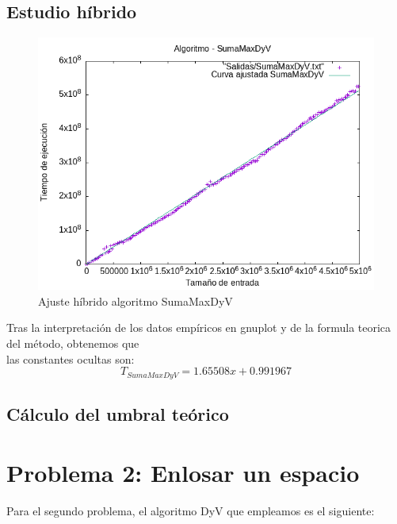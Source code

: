 \documentclass[11pt,openany]{book}
\begin{document}
\subsection{Estudio híbrido}
\begin{center}
      \begin{figure}[h]
            \centering
            \includegraphics[width=0.7\linewidth]{assets/Img/SumaMaxDyV_hib.png}
            \caption{Ajuste híbrido algoritmo SumaMaxDyV}
            \label{fig:sumaMax}
      \end{figure}
\end{center}
Tras la interpretación de los datos empíricos en gnuplot y de la formula teorica del método, obtenemos que \\
las constantes ocultas son:
\begin{equation*}
      T_{SumaMaxDyV}=1.65508x + 0.991967
\end{equation*}
\subsection{Cálculo del umbral teórico}

\newpage
\section{Problema 2: Enlosar un espacio }
Para el segundo problema, el algoritmo DyV que empleamos es el siguiente:
\end{document}
